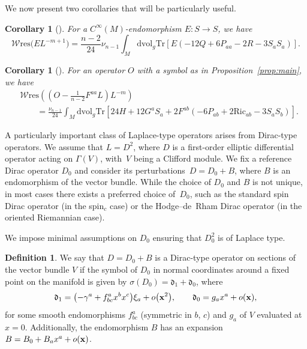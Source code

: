 \documentclass[pdftex]{sigma}
\numberwithin{equation}{section}
\newtheorem{Corollary}[Theorem]{Corollary}
\theoremstyle{definition}
\newtheorem{Definition}[Theorem]{Definition}
\def\W{\mathscr{W} \mathrm{res}}
\def\Tr{\mathrm{Tr}}
\def\dv{\mathrm{dvol}_g}
\begin{document}
We now present two corollaries that will be particularly useful.

\begin{Corollary}[{\cite[Corollary~I.3]{bochniak2025}}]
	\label{lemma:E}
	For a $C^\infty(M)$-endomorphism $E\colon S \to S$, we have
\[%
	\W\bigl(EL^{-m+1}\bigr)=\frac{n-2}{24}\nu_{n-1}\int_M \dv \Tr[E(-12Q+6P_{aa}-2R-3S_aS_a)].
\]
\end{Corollary}

\begin{Corollary}[{\cite[Corollary~I.4]{bochniak2025}}] \label{cor4}
	For an operator $O$ with a symbol as in Proposition~{\rm\ref{prop:main}},
	we have
		\begin{align*}
			& \W \left( \left(O - \frac{1}{n-2}F^{aa}L\right) L^{-m} \right)\\
&\qquad{} = 	
			\frac{\nu_{n-1}}{24}\int_M \dv \Tr[24H +12 G^aS_a + 2F^{ab}(-6P_{ab}+2 \mathrm{Ric}_{ab}-3S_aS_b)].
		\end{align*}
\end{Corollary}

A particularly important class of Laplace-type operators arises from Dirac-type operators. We assume that $L = D^2$, where $D$ is a first-order elliptic differential operator acting on $\Gamma(V)$, with~$V$ being a Clifford module. We fix a reference Dirac operator $D_0$ and consider its perturbations~${D = D_0 + B}$, where $B$ is an endomorphism of the vector bundle. While the choice of $D_0$ and $B$ is not unique, in most cases there exists a preferred choice of~$D_0$, such as the standard spin Dirac operator (in the spin${}_c$ case) or the Hodge--de~Rham Dirac operator (in the oriented Riemannian case).

We impose minimal assumptions on $D_0$ ensuring that $D_0^2$ is of Laplace type.

\begin{Definition}\label{defi2}
	We say that $D = D_0 + B$ is a Dirac-type operator on sections of the vector bundle $V$ if the symbol of $D_0$ in normal coordinates around a fixed point on the manifold is given by $\sigma(D_0)=\mathfrak{d}_1+\mathfrak{d}_0$,
	where
	\[\mathfrak{d}_1=\bigl(-\gamma^a+f^a_{bc}x^b x^c\bigr)\xi_a+ o\bigl({\bf x}^2\bigr), \qquad \mathfrak{d}_0= g_a x^a+ o({\bf x}),\]
	for some smooth endomorphisms $f^a_{bc}$ (symmetric in $b$, $c$) and $g_a$ of $V$ evaluated at $x=0$. Additionally, the endomorphism $B$ has an expansion
	$B=B_0+B_a x^a +o({\bf x})$.
\end{Definition}
\end{document}
